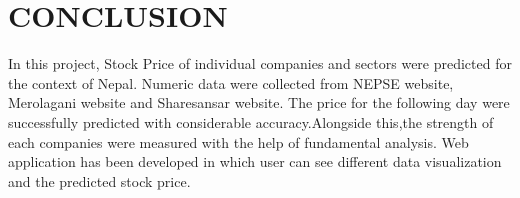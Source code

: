 \section{CONCLUSION}
In this project, Stock Price of individual companies and sectors  were predicted for the context of Nepal. Numeric data were collected from NEPSE website, Merolagani website and Sharesansar website. The price for the following day were successfully predicted with considerable accuracy.Alongside this,the strength of each companies were measured with the help of fundamental analysis. 
Web application has been developed in which user can see different data visualization and the predicted stock price. 


